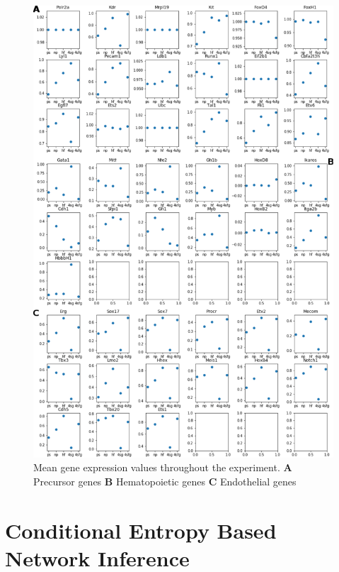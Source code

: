 \documentclass[a4paper,12pt]{book}
\theoremstyle{break}
\begin{document}
	\begin{figure}[h!]
		\centering
		\includegraphics[width = 0.9\linewidth, height = 0.8\textheight]{../Preliminary/exptot.pdf}
		\caption{Mean gene expression values throughout the experiment. \textbf{A} Precursor genes \textbf{B} Hematopoietic genes \textbf{C} Endothelial genes}
		\label{fig:meangene}
	\end{figure}

\clearpage
 \section*{Conditional Entropy Based Network Inference}
 
\end{document}
